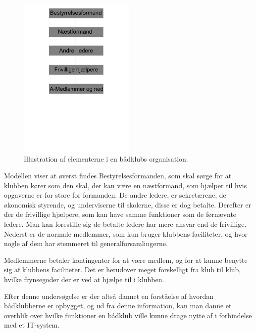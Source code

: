 \begin{figure}[htbp]
  \centering
  \includegraphics[width=0.5\textwidth]{images/organisation/baadOrganisation.pdf}
  \caption[Bådklubs organisation]{Illustration af elementerne i en bådklubs organisation.}
  \label{fig:bådklub-organisation}
\end{figure}

Modellen viser at øverst findes Bestyrelsesformanden, som skal sørge for at klubben kører som den skal, der kan være en næstformand, som hjælper til hvis opgaverne er for store for formanden. De andre ledere, er sekretærene, de økonomisk styrende, og underviserne til skolerne, disse er dog betalte. Derefter er der de frivillige hjælpere, som kan have samme funktioner som de førnævnte ledere. Man kan forestille sig de betalte ledere har mere ansvar end de frivillige. Nederst er de normale medlemmer, som kun bruger klubbens faciliteter, og hvor nogle af dem har stemmeret til generalforsamlingerne.

Medlemmerne betaler kontingenter for at være medlem, og for at kunne benytte sig af klubbens faciliteter. Det er herudover meget forskelligt fra klub til klub, hvilke frynsegoder der er ved at hjælpe til i klubben.

Efter denne undersøgelse er der altså dannet en forståelse af hvordan bådklubberne er opbygget, og ud fra denne information, kan man danne et overblik over hvilke funktioner en bådklub ville kunne drage nytte af i forbindelse med et IT-system.


